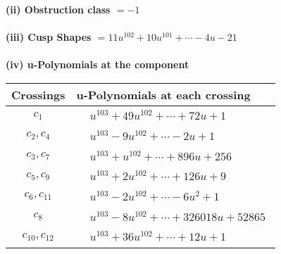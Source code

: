 \documentclass[1p]{elsarticle_modified}
\theoremstyle{definition}
\begin{document}
\flushleft \textbf{(ii) Obstruction class $= -1$}\\~\\
\flushleft \textbf{(iii) Cusp Shapes $= 11 u^{102}+10 u^{101}+\cdots-4 u-21$}\\~\\
\newpage\renewcommand{\arraystretch}{1}
\flushleft \textbf{(iv) u-Polynomials at the component}\newline \\
\begin{tabular}{m{50pt}|m{274pt}}
Crossings & \hspace{64pt}u-Polynomials at each crossing \\
\hline $$\begin{aligned}c_{1}\end{aligned}$$&$\begin{aligned}
&u^{103}+49 u^{102}+\cdots+72 u+1
\end{aligned}$\\
\hline $$\begin{aligned}c_{2},c_{4}\end{aligned}$$&$\begin{aligned}
&u^{103}-9 u^{102}+\cdots-2 u+1
\end{aligned}$\\
\hline $$\begin{aligned}c_{3},c_{7}\end{aligned}$$&$\begin{aligned}
&u^{103}+u^{102}+\cdots+896 u+256
\end{aligned}$\\
\hline $$\begin{aligned}c_{5},c_{9}\end{aligned}$$&$\begin{aligned}
&u^{103}+2 u^{102}+\cdots+126 u+9
\end{aligned}$\\
\hline $$\begin{aligned}c_{6},c_{11}\end{aligned}$$&$\begin{aligned}
&u^{103}-2 u^{102}+\cdots-6 u^2+1
\end{aligned}$\\
\hline $$\begin{aligned}c_{8}\end{aligned}$$&$\begin{aligned}
&u^{103}-8 u^{102}+\cdots+326018 u+52865
\end{aligned}$\\
\hline $$\begin{aligned}c_{10},c_{12}\end{aligned}$$&$\begin{aligned}
&u^{103}+36 u^{102}+\cdots+12 u+1
\end{aligned}$\\
\hline
\end{tabular}\\~\\
\end{document}
